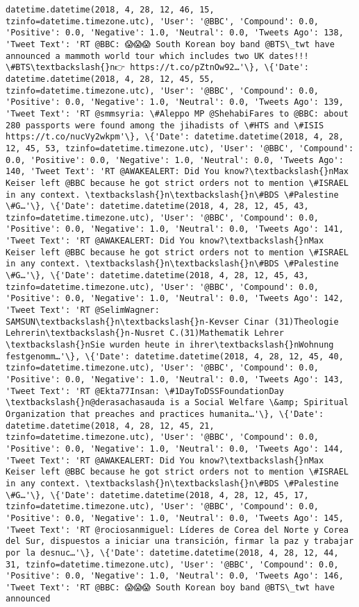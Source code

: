 \documentclass[11pt]{article}
\begin{document}
\begin{Verbatim}[commandchars=\\\{\}]
datetime.datetime(2018, 4, 28, 12, 46, 15, tzinfo=datetime.timezone.utc), 'User': '@BBC', 'Compound': 0.0, 'Positive': 0.0, 'Negative': 1.0, 'Neutral': 0.0, 'Tweets Ago': 138, 'Tweet Text': 'RT @BBC: 😱😱😱 South Korean boy band @BTS\_twt have announced a mammoth world tour which includes two UK dates!!! \#BTS\textbackslash{}n👉 https://t.co/pZtnOw92…'\}, \{'Date': datetime.datetime(2018, 4, 28, 12, 45, 55, tzinfo=datetime.timezone.utc), 'User': '@BBC', 'Compound': 0.0, 'Positive': 0.0, 'Negative': 1.0, 'Neutral': 0.0, 'Tweets Ago': 139, 'Tweet Text': 'RT @smmsyria: \#Aleppo MP @ShehabiFares to @BBC: about 280 passports were found among the jihadists of \#HTS and \#ISIS https://t.co/nucVy2wkpm'\}, \{'Date': datetime.datetime(2018, 4, 28, 12, 45, 53, tzinfo=datetime.timezone.utc), 'User': '@BBC', 'Compound': 0.0, 'Positive': 0.0, 'Negative': 1.0, 'Neutral': 0.0, 'Tweets Ago': 140, 'Tweet Text': 'RT @AWAKEALERT: Did You know?\textbackslash{}nMax Keiser left @BBC because he got strict orders not to mention \#ISRAEL in any context. \textbackslash{}n\textbackslash{}n\#BDS \#Palestine \#G…'\}, \{'Date': datetime.datetime(2018, 4, 28, 12, 45, 43, tzinfo=datetime.timezone.utc), 'User': '@BBC', 'Compound': 0.0, 'Positive': 0.0, 'Negative': 1.0, 'Neutral': 0.0, 'Tweets Ago': 141, 'Tweet Text': 'RT @AWAKEALERT: Did You know?\textbackslash{}nMax Keiser left @BBC because he got strict orders not to mention \#ISRAEL in any context. \textbackslash{}n\textbackslash{}n\#BDS \#Palestine \#G…'\}, \{'Date': datetime.datetime(2018, 4, 28, 12, 45, 43, tzinfo=datetime.timezone.utc), 'User': '@BBC', 'Compound': 0.0, 'Positive': 0.0, 'Negative': 1.0, 'Neutral': 0.0, 'Tweets Ago': 142, 'Tweet Text': 'RT @SelimWagner: SAMSUN\textbackslash{}n\textbackslash{}n-Kevser Cinar (31)Theologie Lehrerin\textbackslash{}n-Nusret C.(31)Mathematik Lehrer \textbackslash{}nSie wurden heute in ihrer\textbackslash{}nWohnung festgenomm…'\}, \{'Date': datetime.datetime(2018, 4, 28, 12, 45, 40, tzinfo=datetime.timezone.utc), 'User': '@BBC', 'Compound': 0.0, 'Positive': 0.0, 'Negative': 1.0, 'Neutral': 0.0, 'Tweets Ago': 143, 'Tweet Text': 'RT @Ekta77Insan: \#1DayToDSSFoundationDay \textbackslash{}n@derasachasauda is a Social Welfare \&amp; Spiritual Organization that preaches and practices humanita…'\}, \{'Date': datetime.datetime(2018, 4, 28, 12, 45, 21, tzinfo=datetime.timezone.utc), 'User': '@BBC', 'Compound': 0.0, 'Positive': 0.0, 'Negative': 1.0, 'Neutral': 0.0, 'Tweets Ago': 144, 'Tweet Text': 'RT @AWAKEALERT: Did You know?\textbackslash{}nMax Keiser left @BBC because he got strict orders not to mention \#ISRAEL in any context. \textbackslash{}n\textbackslash{}n\#BDS \#Palestine \#G…'\}, \{'Date': datetime.datetime(2018, 4, 28, 12, 45, 17, tzinfo=datetime.timezone.utc), 'User': '@BBC', 'Compound': 0.0, 'Positive': 0.0, 'Negative': 1.0, 'Neutral': 0.0, 'Tweets Ago': 145, 'Tweet Text': 'RT @rociosanmiguel: Líderes de Corea del Norte y Corea del Sur, dispuestos a iniciar una transición, firmar la paz y trabajar por la desnuc…'\}, \{'Date': datetime.datetime(2018, 4, 28, 12, 44, 31, tzinfo=datetime.timezone.utc), 'User': '@BBC', 'Compound': 0.0, 'Positive': 0.0, 'Negative': 1.0, 'Neutral': 0.0, 'Tweets Ago': 146, 'Tweet Text': 'RT @BBC: 😱😱😱 South Korean boy band @BTS\_twt have announced 
\end{Verbatim}
\end{document}
